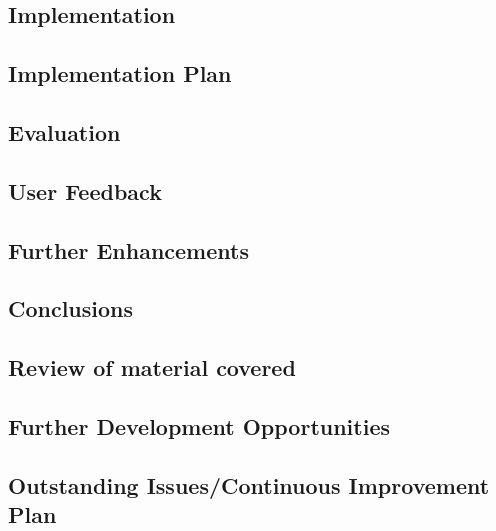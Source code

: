 \documentclass[a4paper,12pt]{article}
\begin{document}
\begin{samepage}
\section {Implementation}
\subsection {Implementation Plan}
\end{samepage}
\begin{samepage}
\section {Evaluation}
\subsection {User Feedback}
\subsection {Further Enhancements}
\end{samepage}
\begin{samepage}
\section {Conclusions}
\subsection {Review of material covered }
\subsection {Further Development Opportunities}
\subsection {Outstanding Issues/Continuous Improvement Plan}
\end{samepage}
\end{document}
